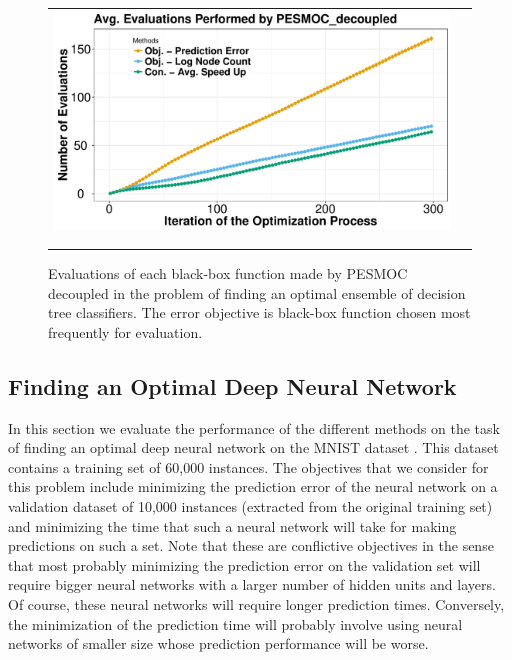 \documentclass[review,preprint,12pt]{elsarticle}
\begin{document}
\begin{figure}[htb]
\begin{center}
        \begin{tabular}{cc}
                \vspace{-.2cm}
                \includegraphics[width=0.75\linewidth]{figures/real/plot_ensemble_counter.pdf} \\ \\
                \vspace{-.1cm}
        \end{tabular}
        \caption{Evaluations of each black-box function made by PESMOC decoupled in the problem of finding an optimal
	ensemble of decision tree classifiers. The error objective is black-box function chosen most frequently for evaluation.} 
        \label{fig:decoupled_ensemble}
\end{center}
\end{figure}


\subsection{Finding an Optimal Deep Neural Network}

In this section we evaluate the performance of the different methods on the task of finding an optimal
deep neural network on the MNIST dataset \citep{lecun2010mnist}. This dataset contains a training set 
of 60,000 instances. The objectives that we consider for this problem include minimizing the prediction error 
of the neural network on a validation dataset of 10,000 instances (extracted from the original training set) 
and minimizing the time that such a neural network will take for making predictions on such a set. Note that these 
are conflictive objectives in the sense that most probably minimizing the prediction error on the validation 
set will require bigger neural networks with a larger number of hidden units 
and layers. Of course, these neural networks will require longer prediction times. Conversely, the minimization of 
the prediction time will probably involve using neural networks of smaller size whose prediction performance will be worse.
\end{document}
